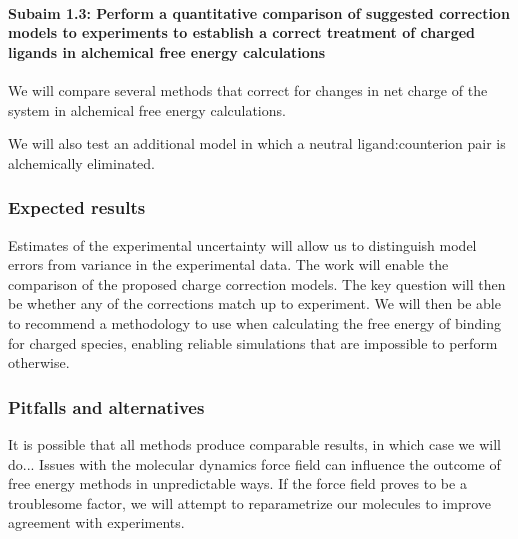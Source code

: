 \documentclass[10pt,final]{article}
\newcommand{\subsubsubsection}[1]{\paragraph*{#1}}
\begin{document}

\subsubsubsection{Subaim 1.3: Perform a quantitative comparison of suggested correction models to experiments to establish a correct treatment of charged ligands in alchemical free energy calculations}
We will compare several methods that correct for changes in net charge of the system in alchemical free energy calculations\cite{Reif2013a,Rocklin2013a}.


We will also test an additional model in which a neutral ligand:counterion pair is alchemically eliminated.

\subsubsection*{Expected results}
Estimates of the experimental uncertainty will allow us to distinguish model errors from variance in the experimental data.
The work will enable the comparison of the proposed charge correction models. 
The key question will then be whether any of the corrections  match up to experiment.
We will then be able to recommend a methodology to use when calculating the free energy of binding for charged species, enabling reliable simulations that are impossible to perform otherwise.
\subsubsection*{Pitfalls and alternatives}

It is possible that all methods produce comparable results, in which case we will do... 
Issues with the molecular dynamics force field can influence the outcome of free energy methods in unpredictable ways. If the force field proves to be a troublesome factor, we will attempt to reparametrize our molecules to improve agreement with experiments.
\end{document}
